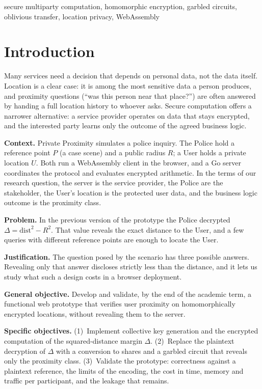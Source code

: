 \documentclass[conference,letterpaper]{IEEEtran}
\begin{document}
\begin{IEEEkeywords}
secure multiparty computation, homomorphic encryption, garbled circuits, oblivious transfer, location privacy, WebAssembly
\end{IEEEkeywords}

\section{Introduction}
Many services need a decision that depends on personal data, not the data itself. Location is a clear case: it is among the most sensitive data a person produces, and proximity questions (``was this person near that place?'') are often answered by handing a full location history to whoever asks. Secure computation offers a narrower alternative: a service provider operates on data that stays encrypted, and the interested party learns only the outcome of the agreed business logic.

\textbf{Context.} Private Proximity simulates a police inquiry. The Police hold a reference point $P$ (a case scene) and a public radius $R$; a User holds a private location $U$. Both run a WebAssembly client in the browser, and a Go server coordinates the protocol and evaluates encrypted arithmetic. In the terms of our research question, the server is the service provider, the Police are the stakeholder, the User's location is the protected user data, and the business logic outcome is the proximity class.

\textbf{Problem.} In the previous version of the prototype the Police decrypted $\Delta = \text{dist}^2 - R^2$. That value reveals the exact distance to the User, and a few queries with different reference points are enough to locate the User.

\textbf{Justification.} The question posed by the scenario has three possible answers. Revealing only that answer discloses strictly less than the distance, and it lets us study what such a design costs in a browser deployment.

\textbf{General objective.} Develop and validate, by the end of the academic term, a functional web prototype that verifies user proximity on homomorphically encrypted locations, without revealing them to the server.

\textbf{Specific objectives.} (1)~Implement collective key generation and the encrypted computation of the squared-distance margin $\Delta$. (2)~Replace the plaintext decryption of $\Delta$ with a conversion to shares and a garbled circuit that reveals only the proximity class. (3)~Validate the prototype: correctness against a plaintext reference, the limits of the encoding, the cost in time, memory and traffic per participant, and the leakage that remains.
\end{document}
